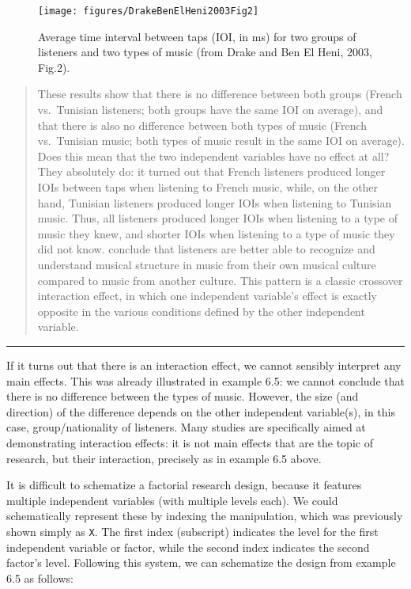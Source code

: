 \documentclass[
]{book}
\begin{document}
\begin{figure}

{\centering \texttt{[image: figures/DrakeBenElHeni2003Fig2]} 

}

\caption{Average time interval between taps (IOI, in ms) for two groups of listeners and two types of music (from Drake and Ben El Heni, 2003, Fig.2).}\label{fig:drakebenelheni2003fig2}
\end{figure}

\begin{quote}
These results show that there is no difference between both groups (French vs.~Tunisian listeners; both groups have the same IOI on average), and that there is also no difference between both types of music (French vs.~Tunisian music; both types of music result in the same IOI on average). Does this mean that the two independent variables have no effect at all? They absolutely do: it turned out that French listeners produced longer IOIs between taps when listening to French music, while, on the other hand, Tunisian listeners produced longer IOIs when listening to Tunisian music. Thus, all listeners produced longer IOIs when listening to a type of music they knew, and shorter IOIs when listening to a type of music they did not know. \citet{Drake03} conclude that listeners are better able to recognize and understand musical structure in music from their own musical culture compared to music from another culture. This pattern is a classic crossover interaction effect, in which one independent variable's effect is exactly opposite in the various conditions defined by the other independent variable.
\end{quote}

\begin{center}\rule{0.5\linewidth}{0.5pt}\end{center}

If it turns out that there is an interaction effect, we cannot sensibly interpret any main effects. This was already illustrated in example 6.5: we cannot conclude that there is no difference between the types of music. However, the size (and direction) of the difference depends on the other independent variable(s), in this case, group/nationality of listeners. Many studies are specifically aimed at demonstrating interaction effects: it is not main effects that are the topic of research, but their interaction, precisely as in example 6.5 above.

It is difficult to schematize a factorial research design, because it features multiple independent variables (with multiple levels each). We could schematically represent these by indexing the manipulation, which was previously shown simply as \texttt{X}. The first index (subscript) indicates the level for the first independent variable or factor, while the second index indicates the second factor's level. Following this system, we can schematize the design from example 6.5 as follows:
\end{document}
